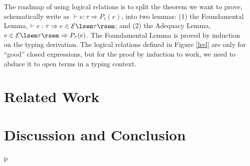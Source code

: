 \documentclass[preprint]{sigplanconf}
\newcommand{\relE}[1]{\mathcal{E}\lsem#1\rsem}
\begin{document}
The roadmap of using logical relations is to split the theorem we want to prove, schematically write as $\vdash e:\tau \Rightarrow P_\tau(e)$, into two lemmas: (1) the Foundamental Lemma, $\vdash e:\tau \Rightarrow e\in\relE{\tau}$; and (2) the Adequacy Lemma, $e\in\relE{\tau} \Rightarrow P_\tau(e)$. The Foundamental Lemma is proved by induction on the typing derivation. The logical relations defined in Figure \ref{lrel} are only for ``good'' closed expressions, but for the proof by induction to work, we need to abduce it to open terms in a typing context.

\section{\label{section-related}Related Work}

\section{\label{section-discussion}Discussion and Conclusion}

\appendix






p




\end{document}
